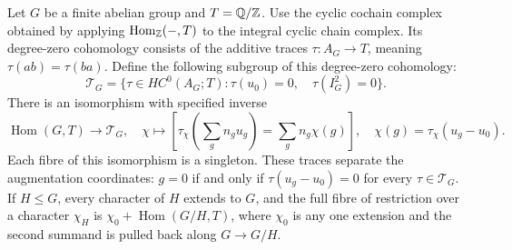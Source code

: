 \begin{theorem}
\label{thm:cyclic-character-bridge}
Let \(G\) be a finite abelian group and \(T=\mathbb Q/\mathbb Z\). Use the
cyclic cochain complex obtained by applying
\(\operatorname{Hom}_{\mathbb Z}(-,T)\) to the integral cyclic chain complex.
Its degree-zero cohomology consists of the additive traces
\(\tau:A_G\to T\), meaning \(\tau(ab)=\tau(ba)\).
Define the following subgroup of this degree-zero cohomology:
\[
 \mathcal T_G=\{\tau\in HC^0(A_G;T):
              \tau(u_0)=0,\quad \tau(I_G^2)=0\}.
\]
There is an isomorphism with specified inverse
\[
 \operatorname{Hom}(G,T)\longrightarrow\mathcal T_G,
 \quad \chi\longmapsto
 \left[\tau_\chi\!\left(\sum_g n_gu_g\right)=\sum_g n_g\chi(g)\right],
 \quad \chi(g)=\tau_\chi(u_g-u_0).
\]
Each fibre of this isomorphism is a singleton. These traces separate
the augmentation coordinates: \(g=0\) if and only if
\(\tau(u_g-u_0)=0\) for every \(\tau\in\mathcal T_G\).
If \(H\leq G\), every character of \(H\) extends to \(G\),
and the full fibre of restriction over a character \(\chi_H\) is
\(\chi_0+\operatorname{Hom}(G/H,T)\), where \(\chi_0\) is any
one extension and the second summand is pulled back along \(G\to G/H\).
\end{theorem}
